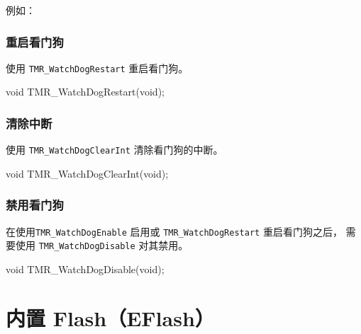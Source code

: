 \documentclass[
  12pt,
]{book}
\newenvironment{Shaded}{\begin{snugshade}}{\end{snugshade}}
\newcommand{\DataTypeTok}[1]{\textcolor[rgb]{0.13,0.29,0.53}{#1}}
\newcommand{\NormalTok}[1]{#1}
\begin{document}
例如：

\hypertarget{ux91cdux542fux770bux95e8ux72d7}{%
\subsection{重启看门狗}\label{ux91cdux542fux770bux95e8ux72d7}}

使用 \texttt{TMR\_WatchDogRestart} 重启看门狗。

\begin{Shaded}
\begin{Highlighting}[]
\DataTypeTok{void}\NormalTok{ TMR_WatchDogRestart(}\DataTypeTok{void}\NormalTok{);}
\end{Highlighting}
\end{Shaded}

\hypertarget{ux6e05ux9664ux4e2dux65ad-1}{%
\subsection{清除中断}\label{ux6e05ux9664ux4e2dux65ad-1}}

使用 \texttt{TMR\_WatchDogClearInt} 清除看门狗的中断。

\begin{Shaded}
\begin{Highlighting}[]
\DataTypeTok{void}\NormalTok{ TMR_WatchDogClearInt(}\DataTypeTok{void}\NormalTok{);}
\end{Highlighting}
\end{Shaded}

\hypertarget{ux7981ux7528ux770bux95e8ux72d7}{%
\subsection{禁用看门狗}\label{ux7981ux7528ux770bux95e8ux72d7}}

在使用\texttt{TMR\_WatchDogEnable} 启用或 \texttt{TMR\_WatchDogRestart} 重启看门狗之后，
需要使用 \texttt{TMR\_WatchDogDisable} 对其禁用。

\begin{Shaded}
\begin{Highlighting}[]
\DataTypeTok{void}\NormalTok{ TMR_WatchDogDisable(}\DataTypeTok{void}\NormalTok{);}
\end{Highlighting}
\end{Shaded}

\hypertarget{ch-eflash}{%
\chapter{内置 Flash（EFlash）}\label{ch-eflash}}
\end{document}
